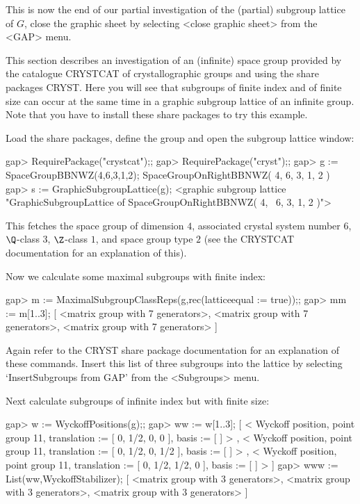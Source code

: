 This  is now  the end of   our partial investigation  of the (partial)
subgroup lattice  of $G$, close  the graphic sheet by selecting <close
graphic sheet> from the <GAP> menu.



This section describes an investigation of an (infinite) space group
provided by the catalogue CRYSTCAT of crystallographic groups and
using the share packages CRYST. Here you will see that subgroups of
finite index and of finite size can occur at the same time in a
graphic subgroup lattice of an infinite group. Note that you have to
install these share packages to try this example.

Load the share packages, define the group and open the subgroup
lattice window: 

\begintt
gap> RequirePackage("crystcat");;
gap> RequirePackage("cryst");;
gap> g := SpaceGroupBBNWZ(4,6,3,1,2);
SpaceGroupOnRightBBNWZ( 4, 6, 3, 1, 2 )
gap> s := GraphicSubgroupLattice(g);
<graphic subgroup lattice "GraphicSubgroupLattice of SpaceGroupOnRightBBNWZ( 4, \
6, 3, 1, 2 )">
\endtt

This fetches the space group of dimension $4$, associated crystal
system number $6$, $\Q$-class 3, $\Z$-class $1$, and space group type
$2$ (see the CRYSTCAT documentation for an explanation of this).

Now we calculate some maximal subgroups with finite index:

\begintt
gap> m := MaximalSubgroupClassReps(g,rec(latticeequal := true));;
gap> mm := m{[1..3]};
[ <matrix group with 7 generators>, <matrix group with 7 generators>, 
  <matrix group with 7 generators> ]
\endtt

Again refer to the CRYST share package documentation for an
explanation of these commands. Insert this list of three subgroups
into the lattice by selecting `InsertSubgroups from GAP' from the
<Subgroups> menu.

Next calculate subgroups of infinite index but with finite size:

\begintt
gap> w := WyckoffPositions(g);;
gap> ww := w{[1..3]};
[ < Wyckoff position, point group 11, translation := [ 0, 1/2, 0, 0 ], 
    basis := [  ] >
    , < Wyckoff position, point group 11, translation := [ 0, 1/2, 0, 1/2 ], 
    basis := [  ] >
    , < Wyckoff position, point group 11, translation := [ 0, 1/2, 1/2, 0 ], 
    basis := [  ] >
     ]
gap> www := List(ww,WyckoffStabilizer);
[ <matrix group with 3 generators>, <matrix group with 3 generators>, 
  <matrix group with 3 generators> ]
\endtt

